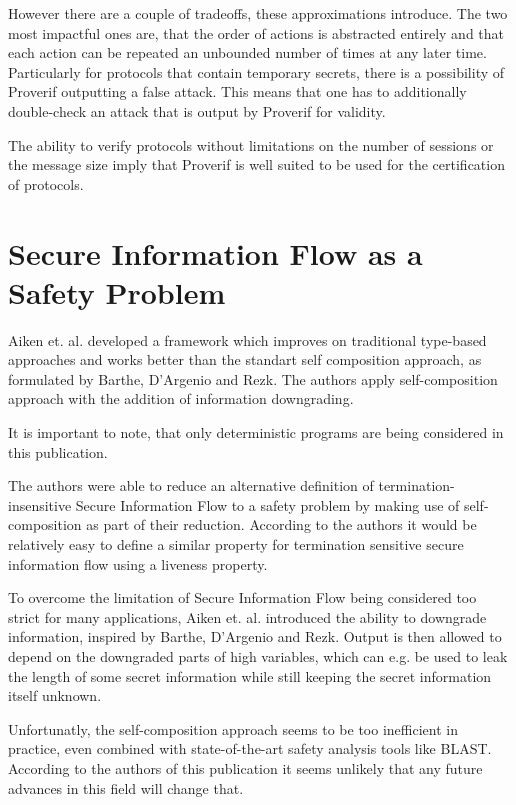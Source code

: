 \documentclass[a4paper,UKenglish]{lipics-v2018}
\begin{document}
However there are a couple of tradeoffs, these approximations introduce. The two most impactful ones are, that the order of actions is abstracted entirely and that each action can be repeated an unbounded number of times at any later time. Particularly for protocols that contain temporary secrets, there is a possibility of Proverif outputting a false attack.
This means that one has to additionally double-check an attack that is output by Proverif for validity. \cite{ProVerif}

The ability to verify protocols without limitations on the number of sessions or the message size imply that Proverif is well suited to be used for the certification of protocols.\cite{ProVerif}


\newpage
\section{Secure Information Flow as a Safety Problem}

Aiken et. al. developed a framework which improves on traditional type-based approaches and works better than the standart self composition approach, as formulated by Barthe, D'Argenio and Rezk. The authors apply  self-composition approach with the addition of information downgrading.\cite{secure_information_flow_safety}


It is important to note, that only deterministic programs are being considered in this publication. 

The authors were able to reduce an alternative definition of termination-insensitive Secure Information Flow to a safety problem by making use of self-composition as part of their reduction. According to the authors it would be relatively easy to define a similar property for termination sensitive secure information flow using a liveness property.\cite{secure_information_flow_safety}

To overcome the limitation of Secure Information Flow being considered too strict for many applications, Aiken et. al. introduced the ability to downgrade information, inspired by Barthe, D'Argenio and Rezk. Output is then allowed to depend on the downgraded parts of high variables, which can e.g. be used to leak the length of some secret information while still keeping the secret information itself unknown.\cite{secure_information_flow_safety}

Unfortunatly, the self-composition approach seems to be too inefficient in practice, even combined with state-of-the-art safety analysis tools like BLAST. According to the authors of this publication it seems unlikely that any future advances in this field will change that.\cite{secure_information_flow_safety}
\end{document}
